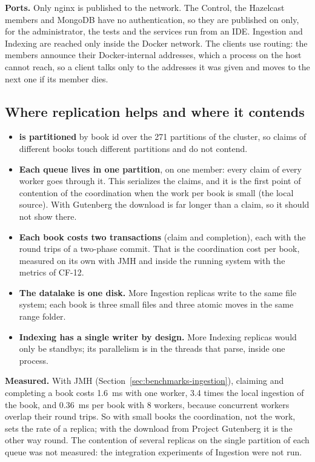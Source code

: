 \textbf{Ports.} Only nginx is published to the network. The Control, the Hazelcast members and MongoDB have no
authentication, so they are published on  only, for the administrator, the tests and the services run
from an IDE. Ingestion and Indexing are reached only inside the Docker network. The clients use 
routing: the members announce their Docker-internal addresses, which a process on the host cannot reach, so a client
talks only to the addresses it was given and moves to the next one if its member dies.

\subsection{Where replication helps and where it contends}

\begin{itemize}
  \item \textbf{ is partitioned} by book id over the 271 partitions of the cluster, so claims of
    different books touch different partitions and do not contend.
  \item \textbf{Each queue lives in one partition}, on one member: every claim of every worker goes through it. This
    serializes the claims, and it is the first point of contention of the coordination when the work per book is small
    (the local source). With Gutenberg the download is far longer than a claim, so it should not show there.
  \item \textbf{Each book costs two transactions} (claim and completion), each with the round trips of a two-phase
    commit. That is the coordination cost per book, measured on its own with JMH and inside the running system with the
    metrics of CF-12.
  \item \textbf{The datalake is one disk.} More Ingestion replicas write to the same file system; each book is three
    small files and three atomic moves in the same range folder.
  \item \textbf{Indexing has a single writer by design.} More Indexing replicas would only be standbys; its parallelism is
    in the threads that parse, inside one process.
\end{itemize}

\textbf{Measured.} With JMH (Section~\ref{sec:benchmarks-ingestion}), claiming and completing a book costs 1.6~ms with
one worker, 3.4 times the local ingestion of the book, and 0.36~ms per book with 8 workers, because concurrent workers
overlap their round trips. So with small books the coordination, not the work, sets the rate of a replica; with the
download from Project Gutenberg it is the other way round. The contention of several replicas on the single partition of
each queue was not measured: the integration experiments of Ingestion were not run.

